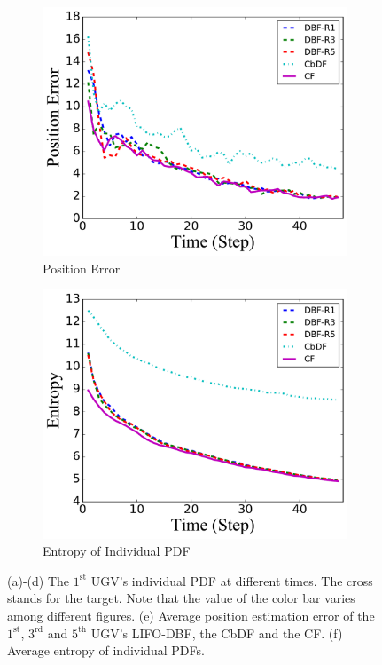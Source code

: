 \documentclass[journal]{IEEEtranTIE}
\theoremstyle{remark}
\begin{document}
\begin{figure}[p]
\begin{subfigure}{0.23\textwidth}
		\includegraphics[width=\textwidth]{figures/brg_sta_sen_sta_tar_pos_err}
		\caption{Position Error}\label{fig:sta_sen_sta_tar_pos_err}
	\end{subfigure}
	\begin{subfigure}{0.23\textwidth}%
		\includegraphics[width=\textwidth]		{figures/brg_sta_sen_sta_tar_entropy}%
		\caption{Entropy of Individual PDF}\label{fig:sta_sen_sta_tar_entropy}
	\end{subfigure}
	\caption{(a)-(d) The $1^\text{st}$ UGV's individual PDF at different times. 
		The cross stands for the target. Note that the value of the color bar varies among different figures. (e) Average position estimation error of the $1^\text{st}$, $3^\text{rd}$ and $5^\text{th}$ UGV's LIFO-DBF, the CbDF and the CF. (f) Average entropy of individual PDFs.}
	\label{fig:sta_sen_sta_tar}
\end{figure}
\end{document}
